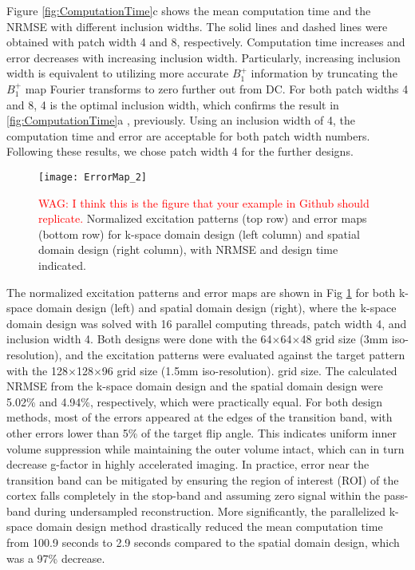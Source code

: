 Figure \ref{fig:ComputationTime}c shows the mean computation time and the NRMSE with different inclusion widths. The solid lines and dashed lines were obtained with patch width 4 and 8, respectively. Computation time increases and error decreases with increasing inclusion width. Particularly, increasing inclusion width is equivalent to utilizing more accurate $B_1^+$ information by truncating the $B_1^+$ map Fourier transforms to zero further out from DC. For both patch widths 4 and 8, 4 is the optimal inclusion width, which confirms the result in \ref{fig:ComputationTime}a , previously. Using an inclusion width of 4, the computation time and error are acceptable for both patch width numbers. Following these results,  we chose patch width 4 for the further designs.

\begin{figure}
	\centering
	\texttt{[image: ErrorMap\_2]}
	\caption{\textcolor{red}{WAG: I think this is the figure that your example in Github should replicate.}
	Normalized excitation patterns (top row) and error maps (bottom row) for k-space domain design (left column) and spatial domain design (right column), with NRMSE and design time indicated.}
	\label{fig:ErrorMap}
\end{figure}
The normalized excitation patterns and error maps are shown in Fig \ref{fig:ErrorMap} for both k-space domain design (left) and spatial domain design (right), where the k-space domain design was solved with 16 parallel computing threads, patch width 4, and inclusion width 4. 
Both designs were done with the 64$\times$64$\times$48 grid size (3mm iso-resolution), and the excitation patterns were evaluated against the target pattern with the 128$\times$128$\times$96 grid size (1.5mm iso-resolution).  grid size. 
The calculated NRMSE from the k-space domain design and the spatial domain design were 5.02\% and 4.94\%, respectively, which were practically equal. For both design methods, most of the errors appeared at the edges of the transition band, with other errors lower than 5\% of the target flip angle. This indicates uniform inner volume suppression while maintaining the outer volume intact, which can in turn decrease g-factor in highly accelerated imaging. In practice, error near the transition band can be mitigated by ensuring the region of interest (ROI) of the cortex falls completely in the stop-band and assuming zero signal within the pass-band during undersampled reconstruction. More significantly, the parallelized k-space domain design method drastically reduced the mean computation time from 100.9 seconds to 2.9 seconds compared to the spatial domain design, which was a 97\% decrease.


